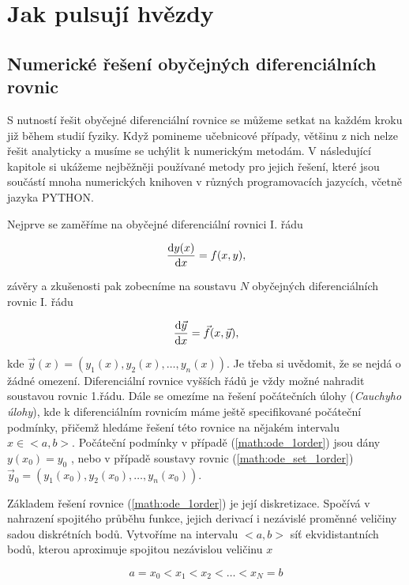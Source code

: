 \chapter{Jak pulsují hvězdy}

\section{Numerické řešení obyčejných diferenciálních rovnic}

S nutností řešit obyčejné diferenciální rovnice se můžeme setkat na každém kroku již během studií fyziky. Když pomineme
učebnicové případy, většinu z nich nelze řešit analyticky a musíme se uchýlit k numerickým metodám. V následující kapitole si ukážeme nejběžněji používané metody pro jejich řešení, které jsou součástí mnoha numerických knihoven v různých programovacích jazycích, včetně jazyka PYTHON. 

Nejprve se zaměříme na obyčejné diferenciální rovnici I. řádu

\begin{equation}
\label{math:ode_1order}
\frac{{\rm d}y(x)}{{\rm d}x} = f(x,y),
\end{equation}

závěry a zkušenosti pak zobecníme na soustavu $N$ obyčejných diferenciálních rovnic I. řádu

\begin{equation}
\label{math:ode_set_1order}
\deriv{\vec{y}}{x} = \vec{f}(x,\vec{y}),
\end{equation}

kde $\vec{y}(x) = (y_1(x),y_2(x),\dots,y_n(x))$. Je třeba si uvědomit, že se nejdá o žádné omezení. Diferenciální rovnice vyšších řádů je vždy možné nahradit soustavou rovnic 1.řádu. Dále se omezíme na řešení počátečních úlohy ({\it Cauchyho úlohy}), kde k diferenciálním rovnicím máme ještě specifikované počáteční podmínky, přičemž hledáme řešení této rovnice na nějakém intervalu $x \in <a,b>$. Počáteční podmínky v případě 
(\ref{math:ode_1order}) jsou dány $y(x_0) = y_0$ , nebo v případě soustavy rovnic (\ref{math:ode_set_1order}) $\vec{y}_0 = (y_1(x_0),y_2(x_0),\dots,y_n(x_0))$.

Základem řešení rovnice  (\ref{math:ode_1order}) je její diskretizace. Spočívá v nahrazení spojitého průběhu funkce, jejich derivací i nezávislé proměnné veličiny sadou diskrétních bodů. Vytvoříme na intervalu $<a,b>$ síť ekvidistantních bodů, kterou aproximuje spojitou nezávislou veličinu $x$

\begin{equation}
a = x_0 < x_1 < x_2 < \dots < x_N = b
\end{equation}

